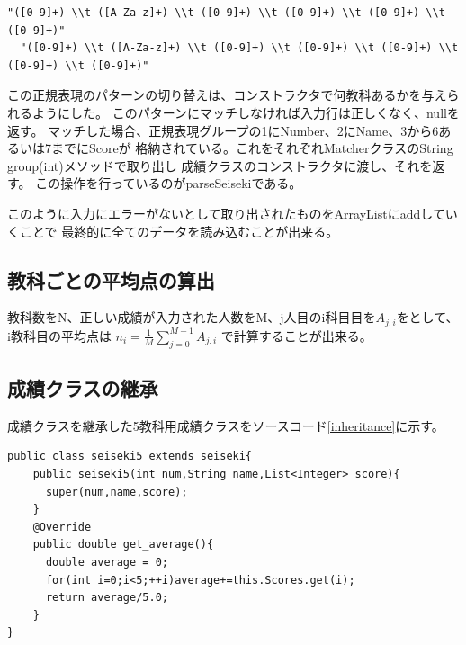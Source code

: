 \documentclass[dvipdfmx]{jsarticle}
\begin{document}
\begin{lstlisting}[caption=入力行の構文解析に使用する正規表現,label=regex2]
  "([0-9]+) \\t ([A-Za-z]+) \\t ([0-9]+) \\t ([0-9]+) \\t ([0-9]+) \\t ([0-9]+)"
  "([0-9]+) \\t ([A-Za-z]+) \\t ([0-9]+) \\t ([0-9]+) \\t ([0-9]+) \\t ([0-9]+) \\t ([0-9]+)"
\end{lstlisting}

この正規表現のパターンの切り替えは、コンストラクタで何教科あるかを与えられるようにした。
このパターンにマッチしなければ入力行は正しくなく、nullを返す。
マッチした場合、正規表現グループの1にNumber、2にName、3から6あるいは7までにScoreが
格納されている。これをそれぞれMatcherクラスのString group(int)メソッドで取り出し
成績クラスのコンストラクタに渡し、それを返す。
この操作を行っているのがparseSeisekiである。

このように入力にエラーがないとして取り出されたものをArrayListにaddしていくことで
最終的に全てのデータを読み込むことが出来る。

\subsection{教科ごとの平均点の算出}

教科数をN、正しい成績が入力された人数をM、j人目のi科目目を$A_{j,i}$をとして、
i教科目の平均点は
$\displaystyle n_i = \frac{1}{M}\sum_{j=0}^{M-1}A_{j,i}$
で計算することが出来る。

\subsection{成績クラスの継承}

成績クラスを継承した5教科用成績クラスをソースコード\ref{inheritance}に示す。
\begin{lstlisting}[caption=成績クラスを継承したクラス,label=inheritance]
  public class seiseki5 extends seiseki{
    public seiseki5(int num,String name,List<Integer> score){
      super(num,name,score);
    }
    @Override
    public double get_average(){
      double average = 0;
      for(int i=0;i<5;++i)average+=this.Scores.get(i);
      return average/5.0;
    }
}
\end{lstlisting}
\end{document}

